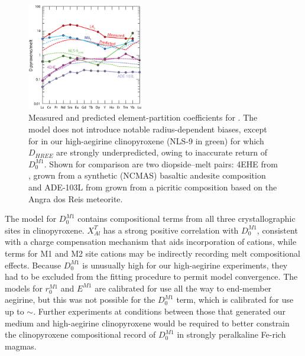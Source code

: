 \documentclass[review,authoryear,12pt]{elsarticle}
\begin{document}
	   	   \begin{figure}[bt]
        \begin{center}
        \includegraphics[width=0.45\textwidth]{14_SpiderDTest.eps}
        \caption[Measured (solid line) and predicted (dashed line) element-partitioning coefficients for ]{Measured and predicted element-partition coefficients for . The model does not introduce notable radius-dependent biases, except for in our high-aegirine clinopyroxene (NLS-9 in green) for which $D_{HREE}$ are strongly underpredicted, owing to inaccurate return of $D_0^{M1}$. Shown for comparison are two diopside--melt pairs: 4EHE from \citet{Hill2000}, grown from a synthetic (NCMAS) basaltic andesite composition and ADE-103L from \citet{Lofgren2006} grown from a picritic composition based on the Angra dos Reis meteorite.}
        \label{14_REEradius}
        \end{center}
        \end{figure}

The model for $D_0^{M1}$ contains compositional terms from all three crystallographic sites in clinopyroxene. $X^T_{Al}$ has a strong positive correlation with $D_0^{M1}$, consistent with a charge compensation mechanism that aids incorporation of  cations, while terms for M1  and M2 site cations may be indirectly recording melt compositional effects. Because $D_0^{M1}$ is unusually high for our high-aegirine experiments, they had to be excluded from the fitting procedure to permit model convergence. The models for $r_0^{M1}$ and $E^{M1}$ are calibrated for use all the way to end-member aegirine, but this was not possible for the $D_0^{M1}$ term, which is calibrated for use up to $\sim$. Further experiments at conditions between those that generated our medium and high-aegirine clinopyroxene would be required to better constrain the clinopyroxene compositional record of $D_0^{M1}$ in strongly peralkaline Fe-rich magmas.
\end{document}
